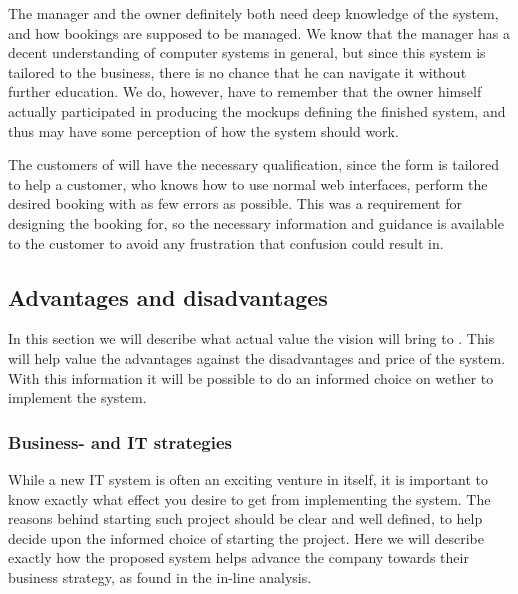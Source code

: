 The manager and the owner definitely both need deep knowledge of the system, 
and how bookings are supposed to be managed. We know that the manager has a 
decent understanding of computer systems in general, but since this system
is tailored to the business, there is no chance that he can navigate it 
without further education. We do, however, have to remember that the owner
himself actually participated in producing the mockups defining the finished
system, and thus may have some perception of how the system should work.

The customers of \gomonkey{} will have the necessary qualification, since the
form is tailored to help a customer, who knows how to use normal web interfaces,
perform the desired booking with as few errors as possible. This was a 
requirement for designing the booking for, so the necessary information and
guidance is available to the customer to avoid any frustration that confusion
could result in.

\subsection{Advantages and disadvantages}
In this section we will describe what actual value the vision will bring to 
\gomonkey. This will help value the advantages against the disadvantages and
price of the system. With this information it will be possible to do an informed
choice on wether to implement the system.

\subsubsection{Business- and IT strategies}
While a new IT system is often an exciting venture in itself, it is important to
know exactly what effect you desire to get from implementing the system. The 
reasons behind starting such project should be clear and well defined, to help
decide upon the informed choice of starting the project. Here we will describe 
exactly how the proposed system helps advance the company towards their 
business strategy, as found in the in-line analysis. 

